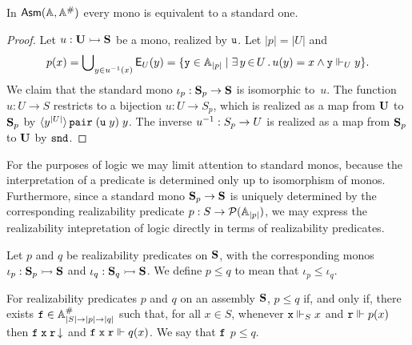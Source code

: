 \begin{proposition}
  In $\mathsf{Asm}(\mathbb{A},\mathbb{A}^{\#})$ every mono is equivalent to a standard one.
\end{proposition}

\begin{proof}
  Let $u : \mathbf{U} \rightarrowtail \mathbf{S}$ be a mono, realized by $\mathtt{u}$.
  Let $|p| = |U|$ and
  \begin{equation*}
    p(x) = \bigcup\nolimits_{y \in {u}^{-1}(x)} \mathsf{E}_U(y) =
    \{\mathtt{y} \in \mathbb{A}_{|p|} \mid \exists\, y \,{\in}\, U\,.\,u(y) = x \land \mathtt{y} \Vdash_U y\}.
  \end{equation*}
  We claim that the standard mono $\iota_p : \mathbf{S}_p \to \mathbf{S}$ is
  isomorphic to~$u$. The function $u : U \to S$ restricts to a
  bijection $u : U \to S_p$, which is realized as a map from $\mathbf{U}$
  to $\mathbf{S}_p$ by
  $\langle y^{|U|} \rangle\,\mathtt{pair}\;(\mathtt{u}\;y)\;y$. The inverse
  ${u}^{-1} : S_p \to U$ is realized as a map from $\mathbf{S}_p$ to
  $\mathbf{U}$ by $\mathtt{snd}$.
\end{proof}

For the purposes of logic we may limit attention to standard monos,
because the interpretation of a predicate is determined only up to
isomorphism of monos. Furthermore, since a standard mono $\mathbf{S}_p
\to \mathbf{S}$ is uniquely determined by the corresponding realizability
predicate $p : S \to \mathcal{P}(\mathbb{A}_{|p|})$, we may express the
realizability intepretation of logic directly in terms of
realizability predicates.

Let $p$ and $q$ be realizability predicates on $\mathbf{S}$, with the
corresponding monos $\iota_p : \mathbf{S}_p \rightarrowtail \mathbf{S}$ and $\iota_q
: \mathbf{S}_q \rightarrowtail \mathbf{S}$. We define $p \leq q$ to mean that
$\iota_p \leq \iota_q$.

\begin{lemma}
  \label{lemma:realizability-predicate-leq}%
  For realizability predicates $p$ and $q$ on an assembly $\mathbf{S}$,
  $p \leq q$ if, and only if, there exists $\mathtt{f} \in \mathbb{A}^{\#}_{|S|
    \to |p| \to |q|}$ such that, for all $x \in S$, whenever $\mathtt{x}
  \Vdash_S x$ and $\mathtt{r} \Vdash p(x)$ then $\mathtt{f}\;\mathtt{x}\;\mathtt{r}\,{\downarrow}$
  and $\mathtt{f}\;\mathtt{x}\;\mathtt{r} \Vdash q(x)$. We say that $\mathtt{f}$
   $p \leq q$.
\end{lemma}

